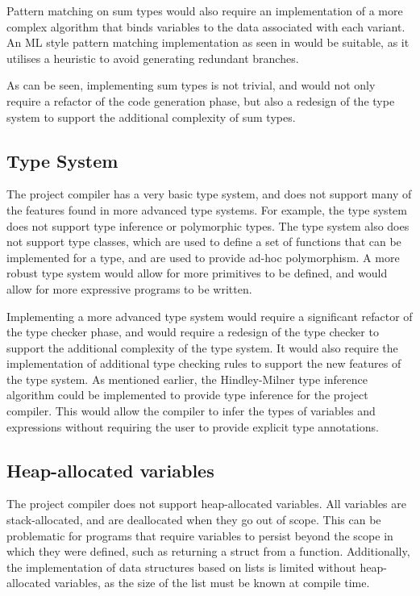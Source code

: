 Pattern matching on sum types would also require an implementation of a more complex algorithm that
binds variables to the data associated with each variant. An ML style pattern matching
implementation as seen in \autocite{jacobs2021pattern} would be suitable, as it utilises a heuristic
to avoid generating redundant branches.

As can be seen, implementing sum types is not trivial, and would not only require a refactor of the
code generation phase, but also a redesign of the type system to support the additional complexity
of sum types.

\subsection{Type System}

The project compiler has a very basic type system, and does not support many of the features found
in more advanced type systems. For example, the type system does not support type inference or
polymorphic types. The type system also does not support type classes, which are used to define a
set of functions that can be implemented for a type, and are used to provide ad-hoc polymorphism.
A more robust type system would allow for more primitives to be defined, and would allow for more
expressive programs to be written.

Implementing a more advanced type system would require a significant refactor of the type checker
phase, and would require a redesign of the type checker to support the additional complexity of the
type system. It would also require the implementation of additional type checking rules to support
the new features of the type system. As mentioned earlier, the Hindley-Milner type inference
algorithm could be implemented to provide type inference for the project compiler. This would allow
the compiler to infer the types of variables and expressions without requiring the user to provide
explicit type annotations.

\subsection{Heap-allocated variables}

The project compiler does not support heap-allocated variables. All variables are stack-allocated,
and are deallocated when they go out of scope. This can be problematic for programs that require
variables to persist beyond the scope in which they were defined, such as returning a struct from a
function. Additionally, the implementation of data structures based on lists is limited without
heap-allocated variables, as the size of the list must be known at compile time.

